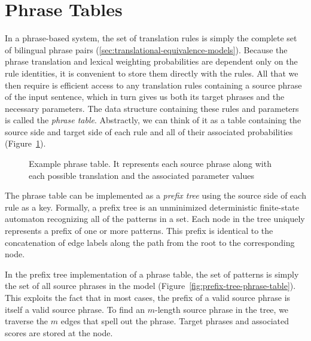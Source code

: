 \section{Phrase Tables}\label{sec:phrase-tables}

In a phrase-based system, the set of translation rules is simply
the complete set of bilingual phrase pairs
(\textsection\ref{sec:translational-equivalence-models}).
Because the phrase translation and lexical weighting probabilities 
are dependent only on the rule identities, it is convenient to store 
them directly with the rules.  All that we then require is efficient 
access to any translation rules containing a source phrase 
of the input sentence, which in turn gives us both its target 
phrases and the necessary parameters.  The data structure containing 
these rules and parameters is called the {\em phrase table}.  Abstractly,
we can think of it as a table containing the source side and target side
of each rule and all of their associated probabilities 
(Figure~\ref{fig:phrase-table}).

\figpreamble
\begin{figure}
	\figfontsize{
	\begin{center}
	
	\end{center}}
	\figpostamble
	\caption[Example phrase table.]{Example phrase table.
	It represents each source phrase along with each possible 
	translation and the associated parameter values}
	\label{fig:phrase-table}	
\end{figure}

The phrase table can be implemented as a {\em prefix tree}
\citep[or {\em trie}; ][]{Briandias:1959:wjcc,Fredkin:1960:cacm}
using the source side of each rule as a key.  Formally, a prefix tree is an
unminimized deterministic finite-state automaton recognizing 
all of the patterns in a set.  Each node in the 
tree uniquely represents a prefix of one or more patterns.
This prefix is identical to the concatenation of edge
labels along the path from the root to the corresponding node.

In the prefix tree implementation of a phrase table, the set of patterns
is simply the set of all source phrases in the model 
(Figure~\ref{fig:prefix-tree-phrase-table}).  This exploits
the fact that in most cases, the prefix of a valid source phrase
is itself a valid source phrase.  To find an $m$-length source phrase in the
tree, we traverse the $m$ edges that spell out the phrase.  Target
phrases and associated scores are stored at the node.

